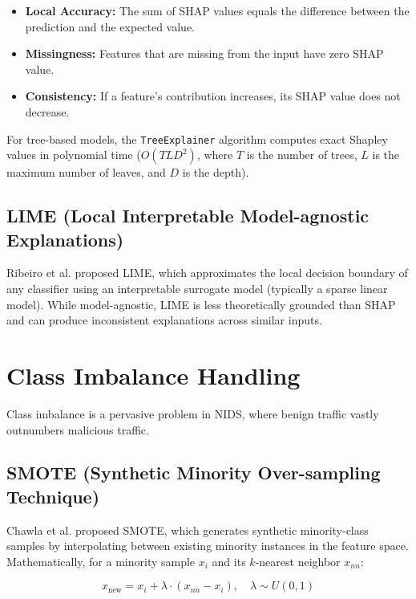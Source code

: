 \begin{itemize}
    \item \textbf{Local Accuracy:} The sum of SHAP values equals the difference between the prediction and the expected value.
    \item \textbf{Missingness:} Features that are missing from the input have zero SHAP value.
    \item \textbf{Consistency:} If a feature's contribution increases, its SHAP value does not decrease.
\end{itemize}

For tree-based models, the \texttt{TreeExplainer} algorithm computes exact Shapley values in polynomial time ($O(TLD^2)$, where $T$ is the number of trees, $L$ is the maximum number of leaves, and $D$ is the depth).

\subsection{LIME (Local Interpretable Model-agnostic Explanations)}

Ribeiro et al. \cite{ribeiro2016should} proposed LIME, which approximates the local decision boundary of any classifier using an interpretable surrogate model (typically a sparse linear model). While model-agnostic, LIME is less theoretically grounded than SHAP and can produce inconsistent explanations across similar inputs.

\section{Class Imbalance Handling}

Class imbalance is a pervasive problem in NIDS, where benign traffic vastly outnumbers malicious traffic.

\subsection{SMOTE (Synthetic Minority Over-sampling Technique)}

Chawla et al. \cite{chawla2002smote} proposed SMOTE, which generates synthetic minority-class samples by interpolating between existing minority instances in the feature space. Mathematically, for a minority sample $x_i$ and its $k$-nearest neighbor $x_{nn}$:

\begin{equation}
x_{\text{new}} = x_i + \lambda \cdot (x_{nn} - x_i), \quad \lambda \sim U(0, 1)
\label{eq:smote}
\end{equation}

